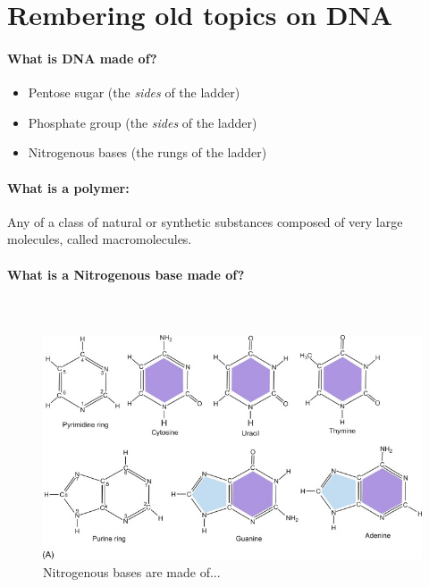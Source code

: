 
\section{Rembering old topics on DNA}

\paragraph{What is DNA made of?}

\begin{itemize}
    \item Pentose sugar (the \emph{sides} of the ladder)
    \item Phosphate group (the \emph{sides} of the ladder)
    \item Nitrogenous bases (the rungs of the ladder)
\end{itemize}

\paragraph{What is a polymer: \\}
Any of a class of natural or synthetic substances composed of very large molecules, called macromolecules.

\paragraph{What is a Nitrogenous base made of?}
\paragraph{\\}
\begin{figure}[htbp]
    \centerline{\includegraphics{bases.jpg}}
    \caption{Nitrogenous bases are made of...}
    \label{fig}
\end{figure}

